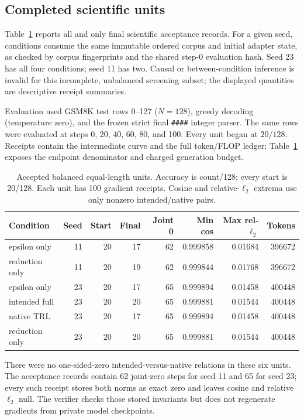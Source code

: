 \documentclass{article}
\begin{document}
\subsection{Completed scientific units}

Table~\ref{tab:runs} reports all and only final scientific acceptance records.
For a given seed, conditions consume the same immutable ordered corpus and
initial adapter state, as checked by corpus fingerprints and the shared step-0
evaluation hash.  Seed 23 has all four conditions; seed 11 has two.  Causal or
between-condition inference is invalid for this incomplete, unbalanced
screening subset; the displayed quantities are descriptive receipt summaries.

Evaluation used GSM8K test rows 0--127 ($N=128$), greedy decoding
(temperature zero), and the frozen strict final \texttt{\#\#\#\#} integer
parser.  The same rows were evaluated at steps 0, 20, 40, 60, 80, and 100.
Every unit began at $20/128$.  Receipts contain the intermediate curve and the
full token/FLOP ledger; Table~\ref{tab:runs} exposes the endpoint denominator
and charged generation budget.

\begin{table}[t]
  \centering
  \caption{Accepted balanced equal-length units.  Accuracy is count/128;
  every start is 20/128.  Each unit has 100 gradient receipts.  Cosine and
  relative-$\ell_2$ extrema use only nonzero intended/native pairs.}
  \label{tab:runs}
  \scriptsize
  \begin{tabular}{lrrrrrrr}
    \toprule
    Condition & Seed & Start & Final & Joint 0 & Min cos & Max rel-$\ell_2$ & Tokens \\
    \midrule
    epsilon only & 11 & 20 & 17 & 62 & 0.999858 & 0.01684 & 396672 \\
    reduction only & 11 & 20 & 19 & 62 & 0.999844 & 0.01768 & 396672 \\
    epsilon only & 23 & 20 & 17 & 65 & 0.999894 & 0.01458 & 400448 \\
    intended full & 23 & 20 & 20 & 65 & 0.999881 & 0.01544 & 400448 \\
    native TRL & 23 & 20 & 17 & 65 & 0.999894 & 0.01458 & 400448 \\
    reduction only & 23 & 20 & 20 & 65 & 0.999881 & 0.01544 & 400448 \\
    \bottomrule
  \end{tabular}
\end{table}

There were no one-sided-zero intended-versus-native relations in these six
units.  The acceptance records contain 62 joint-zero steps for seed 11 and 65
for seed 23; every such receipt stores both norms as exact zero and leaves
cosine and relative $\ell_2$ null.  The verifier checks those stored invariants
but does not regenerate gradients from private model checkpoints.
\end{document}
